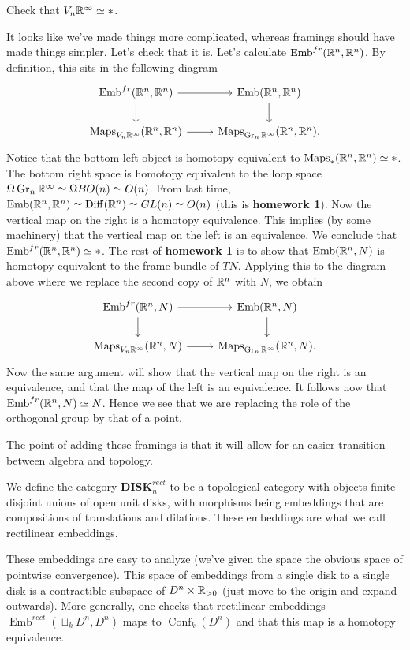 \documentclass{amsart}
\DeclareMathOperator{\Emb}{Emb}
\DeclareMathOperator{\Conf}{Conf}
\begin{document}
\begin{exercise}
    Check that $V_n\mathbb{R}^\infty\simeq *$.
\end{exercise}

It looks like we've made things more complicated, whereas framings should have made
things simpler. Let's check that it is. Let's calculate $\Emb^{fr}(\R^n, \R^n)$.
By definition, this sits in the following diagram
\begin{equation*}
    \begin{tikzcd}
        \Emb^{fr}(\R^n, \R^n) \rar\dar & \Emb(\R^n, \R^n)\dar \\
        \Maps_{V_n\R^\infty}(\R^n, \R^n) \rar & \Maps_{\Gr_n\R^\infty}(\R^n,\R^n).
    \end{tikzcd}
\end{equation*}
Notice that the bottom left object is homotopy equivalent to $\operatorname{Maps}_*(\mathbb{R}^n,\mathbb{R}^n)\simeq *$.
The bottom right space is homotopy equivalent to the loop space $\Omega\operatorname{Gr}_n\mathbb{R}^\infty\simeq \Omega BO(n)\simeq O(n)$.
From last time, $\Emb(\R^n,\R^n)\simeq \Diff(\R^n)\simeq GL(n)\simeq O(n)$ (this is
\textbf{homework 1}). Now the vertical map on the right is a homotopy equivalence.
This implies (by some machinery) that the vertical map on the left is an equivalence.
We conclude that $\Emb^{fr}(\R^n,\R^n)\simeq *$. The rest of \textbf{homework 1} is to
show that $\Emb(\R^n, N)$ is homotopy equivalent to the frame bundle of $TN$. Applying this
to the diagram above where we replace the second copy of $\mathbb{R}^n$ with $N$, we obtain
\begin{equation*}
    \begin{tikzcd}
        \Emb^{fr}(\R^n, N) \rar\dar & \Emb(\R^n, N)\dar \\
        \Maps_{V_n\R^\infty}(\R^n, N) \rar & \Maps_{\Gr_n\R^\infty}(\R^n,N).
    \end{tikzcd}
\end{equation*}
Now the same argument will show that the vertical map on the right is an equivalence,
and that the map of the left is an equivalence. It follows now that $\Emb^{fr}(\R^n,N)\simeq N$.
Hence we see that we are replacing the role of the orthogonal group by that of a point.

The point of adding these framings is that it will allow for an easier transition between
algebra and topology.
\begin{definition}
    We define the category $\mathbf{DISK}_n^{rect}$ to be a topological category with objects
    finite disjoint unions of open unit disks, with morphisms being embeddings that are compositions
    of translations and dilations. These embeddings are what we call rectilinear embeddings.
\end{definition}
These embeddings are easy to analyze (we've given the space the obvious space of pointwise
convergence). This space of embeddings from a single disk to a single disk is a contractible
subspace of $D^n\times\mathbb{R}_{>0}$ (just move to the origin and expand outwards). More generally,
one checks that rectilinear embeddings $\Emb^{rect}(\sqcup_k D^n, D^n)$ maps to
$\Conf_k(D^n)$ and that this map is a homotopy equivalence.
\end{document}
